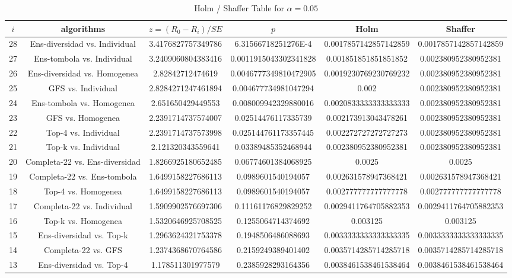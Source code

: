 \documentclass[a4paper,10pt]{article}
\begin{document}
\begin{landscape}
\begin{table}[!htp]
\centering\tiny
\caption{Holm / Shaffer Table for $\alpha=0.05$}
\begin{tabular}{cccccc}
$i$&algorithms&$z=(R_0 - R_i)/SE$&$p$&Holm&Shaffer\\
\hline
28&Ens-diversidad vs. Individual&3.4176827757349786&6.31566718251276E-4&0.0017857142857142859&0.0017857142857142859\\
27&Ens-tombola vs. Individual&3.2409060804383416&0.0011915043302341828&0.001851851851851852&0.002380952380952381\\
26&Ens-diversidad vs. Homogenea&2.82842712474619&0.0046777349810472905&0.0019230769230769232&0.002380952380952381\\
25&GFS vs. Individual&2.8284271247461894&0.004677734981047294&0.002&0.002380952380952381\\
24&Ens-tombola vs. Homogenea&2.651650429449553&0.008009942329880016&0.0020833333333333333&0.002380952380952381\\
23&GFS vs. Homogenea&2.2391714737574007&0.02514476117335739&0.002173913043478261&0.002380952380952381\\
22&Top-4 vs. Individual&2.2391714737573998&0.025144761173357445&0.002272727272727273&0.002380952380952381\\
21&Top-k vs. Individual&2.121320343559641&0.03389485352468944&0.002380952380952381&0.002380952380952381\\
20&Completa-22 vs. Ens-diversidad&1.8266925180652485&0.06774601384068925&0.0025&0.0025\\
19&Completa-22 vs. Ens-tombola&1.6499158227686113&0.0989601540194057&0.002631578947368421&0.002631578947368421\\
18&Top-4 vs. Homogenea&1.6499158227686113&0.0989601540194057&0.002777777777777778&0.002777777777777778\\
17&Completa-22 vs. Individual&1.5909902576697306&0.11161176829829252&0.0029411764705882353&0.0029411764705882353\\
16&Top-k vs. Homogenea&1.5320646925708525&0.1255064714374692&0.003125&0.003125\\
15&Ens-diversidad vs. Top-k&1.2963624321753378&0.1948506486088693&0.0033333333333333335&0.0033333333333333335\\
14&Completa-22 vs. GFS&1.2374368670764586&0.2159249389401402&0.0035714285714285718&0.0035714285714285718\\
13&Ens-diversidad vs. Top-4&1.178511301977579&0.2385928293164356&0.0038461538461538464&0.0038461538461538464\\

\end{tabular}
\end{table}
\end{landscape}
\end{document}
